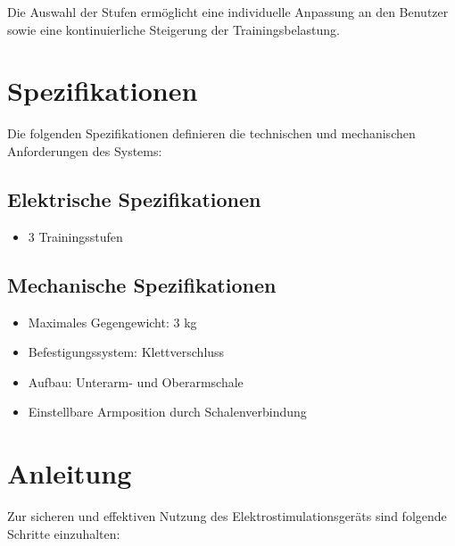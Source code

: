 \documentclass{article}
\begin{document}
Die Auswahl der Stufen ermöglicht eine individuelle Anpassung an den Benutzer sowie eine kontinuierliche Steigerung der Trainingsbelastung.

\section{Spezifikationen}

Die folgenden Spezifikationen definieren die technischen und mechanischen Anforderungen des Systems:
\subsection{Elektrische Spezifikationen}
\begin{itemize}
\item 3 Trainingsstufen 
\end{itemize}

\subsection{Mechanische Spezifikationen}
\begin{itemize}
\item Maximales Gegengewicht: 3 kg
\item Befestigungssystem: Klettverschluss
\item Aufbau: Unterarm- und Oberarmschale
\item Einstellbare Armposition durch Schalenverbindung
\end{itemize}

\newpage
\section{Anleitung}

Zur sicheren und effektiven Nutzung des Elektrostimulationsgeräts sind folgende Schritte einzuhalten:
\end{document}
